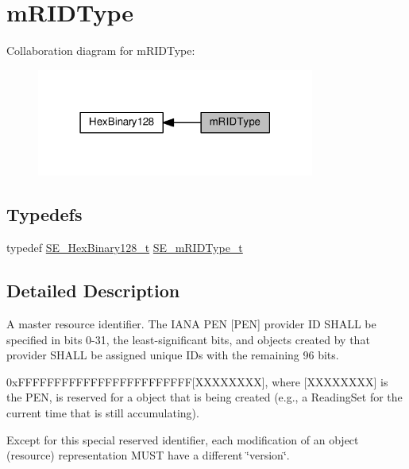\hypertarget{group__mRIDType}{}\section{m\+R\+I\+D\+Type}
\label{group__mRIDType}
Collaboration diagram for m\+R\+I\+D\+Type\+:\nopagebreak
\begin{figure}[H]
\begin{center}
\leavevmode
\includegraphics[width=259pt]{group__mRIDType}
\end{center}
\end{figure}
\subsection*{Typedefs}
\begin{DoxyCompactItemize}
\item 
typedef \hyperlink{group__HexBinary128_gae3e6f0afe8ab371017bc37a0831926c5}{S\+E\+\_\+\+Hex\+Binary128\+\_\+t} \hyperlink{group__mRIDType_gac74622112f3a388a2851b2289963ba5e}{S\+E\+\_\+m\+R\+I\+D\+Type\+\_\+t}
\end{DoxyCompactItemize}


\subsection{Detailed Description}
A master resource identifier. The I\+A\+NA P\+EN \mbox{[}P\+EN\mbox{]} provider ID S\+H\+A\+LL be specified in bits 0-\/31, the least-\/significant bits, and objects created by that provider S\+H\+A\+LL be assigned unique I\+Ds with the remaining 96 bits.

0x\+F\+F\+F\+F\+F\+F\+F\+F\+F\+F\+F\+F\+F\+F\+F\+F\+F\+F\+F\+F\+F\+F\+FF\mbox{[}X\+X\+X\+X\+X\+X\+XX\mbox{]}, where \mbox{[}X\+X\+X\+X\+X\+X\+XX\mbox{]} is the P\+EN, is reserved for a object that is being created (e.\+g., a Reading\+Set for the current time that is still accumulating).

Except for this special reserved identifier, each modification of an object (resource) representation M\+U\+ST have a different \char`\"{}version\char`\"{}. 

